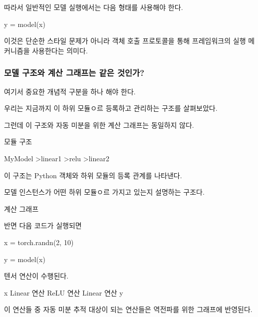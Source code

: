 따라서 일반적인 모델 실행에서는 다음 형태를 사용해야 한다.

\begin{dhkcode}
y = model(x)
\end{dhkcode}

이것은 단순한 스타일 문제가 아니라 객체 호출 프로토콜을 통해 프레임워크의 실행 메커니즘을 사용한다는 의미다.

\subsubsection{모델 구조와 계산 그래프는 같은 것인가?}

여기서 중요한 개념적 구분을 하나 해야 한다.

우리는 지금까지 이 하위 모듈ㅇ르 등록하고 관리하는 구조를 살펴보았다.

그런데 이 구조와 자동 미분을 위한 계산 그래프는 동일하지 않다.

\begin{dhknote}
\begin{dhksmry}[centered]
모듈 구조
\end{dhksmry}
\end{dhknote}

\begin{dhkdir}[in=6]
MyModel
>linear1
>relu
>linear2
\end{dhkdir}

이 구조는 Python 객체와 하위 모듈의 등록 관계를 나타낸다.

모델 인스턴스가 어떤 하위 모듈ㅇ르 가지고 있는지 설명하는 구조다.

\begin{dhknote}
\begin{dhksmry}[centered]
계산 그래프
\end{dhksmry}
\end{dhknote}

반면 다음 코드가 실행되면

\begin{dhkcode}
x = torch.randn(2, 10)

y = model(x)
\end{dhkcode}

텐서 연산이 수행된다.

\begin{dhksmry}[centered]
x
\da
Linear 연산
\da
ReLU 연산
\da
Linear 연산
\da
y
\end{dhksmry}

이 연산들 중 자동 미분 추적 대상이 되는 연산들은 역전파를 위한 그래프에 반영된다.

